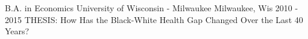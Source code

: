 

\begin{cventries}

  \cventry
    {B.A. in Economics} %
    {University of Wisconsin - Milwaukee} %
    {Milwaukee, Wis} %
    {2010 - 2015} %
    {THESIS: How Has the Black-White Health Gap Changed Over the Last 40 Years?}
    

\end{cventries}
